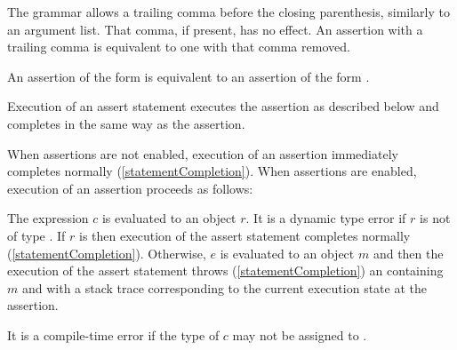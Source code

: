\documentclass[makeidx]{article}
\begin{document}
{\LMHash{}%
The grammar allows a trailing comma before the closing parenthesis,
similarly to an argument list.
That comma, if present, has no effect.
An assertion with a trailing comma is equivalent to one with that comma removed.

\LMHash{}%
An assertion of the form  is equivalent to an assertion of the form .

\LMHash{}%
Execution of an assert statement executes the assertion as described below
and completes in the same way as the assertion.

\LMHash{}%
When assertions are not enabled,
execution of an assertion immediately completes normally
(\ref{statementCompletion}).
When assertions are enabled,
execution of an assertion  proceeds as follows:

\LMHash{}%
The expression $c$ is evaluated to an object $r$.
It is a dynamic type error if $r$ is not of type .
If $r$ is \TRUE{} then execution of the assert statement completes normally (\ref{statementCompletion}).
Otherwise, $e$ is evaluated to an object $m$
and then the execution of the assert statement throws (\ref{statementCompletion}) an  containing $m$ and with a stack trace corresponding to the current execution state at the assertion.

\LMHash{}%
It is a compile-time error if the type of $c$ may not be assigned to .




}
\end{document}
